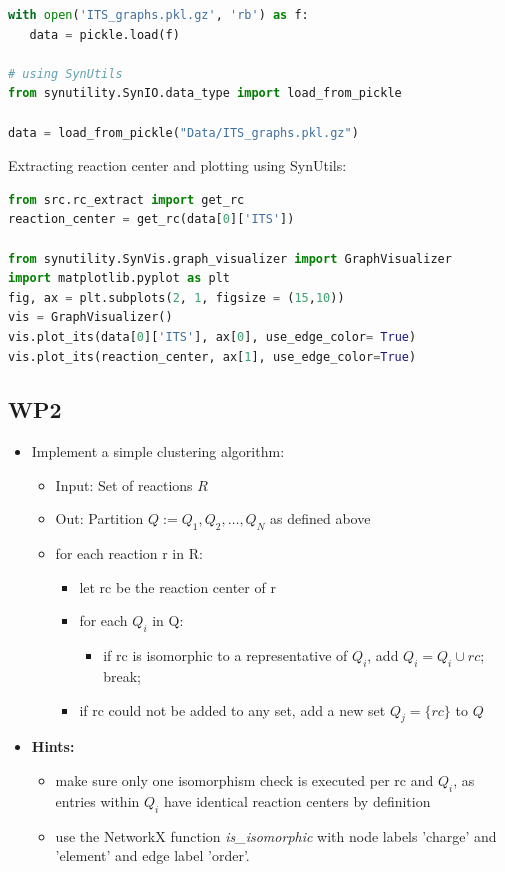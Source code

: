 \documentclass[a4,12pt]{article}
\theoremstyle{plain}
\numberwithin{theorem}{section}
\begin{document}
\begin{itemize}
\begin{lstlisting}[language=Python]
with open('ITS_graphs.pkl.gz', 'rb') as f:
   data = pickle.load(f)
   
# using SynUtils
from synutility.SynIO.data_type import load_from_pickle

data = load_from_pickle("Data/ITS_graphs.pkl.gz")
\end{lstlisting}

Extracting reaction center and plotting using SynUtils:
\begin{lstlisting}[language=Python]
from src.rc_extract import get_rc
reaction_center = get_rc(data[0]['ITS'])

from synutility.SynVis.graph_visualizer import GraphVisualizer
import matplotlib.pyplot as plt
fig, ax = plt.subplots(2, 1, figsize = (15,10))
vis = GraphVisualizer()
vis.plot_its(data[0]['ITS'], ax[0], use_edge_color= True)
vis.plot_its(reaction_center, ax[1], use_edge_color=True)
\end{lstlisting}
\end{itemize}

\subsection{WP2}

\begin{itemize}
\item Implement a simple clustering algorithm:
\begin{itemize}
\item Input: Set of reactions $R$
\item Out: Partition $Q:=Q_1, Q_2, \ldots, Q_N$ as defined above
\item for each reaction r in R:
\begin{itemize}
\item[] let rc be the reaction center of r
\item[] for each $Q_i$ in Q:
\begin{itemize}
\item[]  if rc is isomorphic to a representative of $Q_i$, add $Q_i = Q_i \cup rc$; break;
\end{itemize}
\item[]  if rc could not be added to any set, add a new set $Q_j = \{rc\}$ to $Q$
\end{itemize}
\end{itemize}
\item \textbf{Hints:}
\begin{itemize}
\item make sure only one isomorphism check is executed per rc and $Q_i$, as entries within $Q_i$ have identical reaction centers by definition
\item use the NetworkX function \textit{is\_isomorphic} with node labels 'charge' and 'element' and edge label 'order'.
\end{itemize}
\end{itemize}
\end{document}
